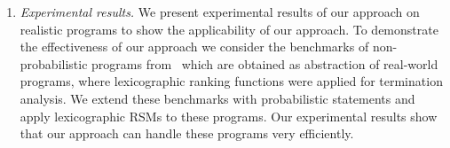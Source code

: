 \begin{enumerate}
\item {\em Experimental results.} 
We present experimental results of our approach on realistic programs to show the applicability 
of our approach. 
To demonstrate the effectiveness of our approach we consider the benchmarks of non-probabilistic
programs from~\cite{ADFG10:lexicographic} which are obtained as abstraction of 
real-world programs, 
where 
lexicographic ranking functions were applied for termination analysis. 
We extend these benchmarks with probabilistic statements and apply lexicographic RSMs to these
programs. 
Our experimental results show that our approach can handle these programs very efficiently.


\end{enumerate}






